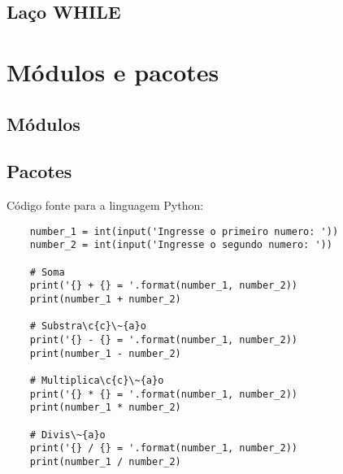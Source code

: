            \subsection{La\c{c}o WHILE}


    \section{M\'{o}dulos e pacotes}



            \subsection{M\'{o}dulos}



            \subsection{Pacotes}






    C\'{o}digo fonte para a linguagem Python:
    \begin{lstlisting}
    number_1 = int(input('Ingresse o primeiro numero: '))
    number_2 = int(input('Ingresse o segundo numero: '))

    # Soma
    print('{} + {} = '.format(number_1, number_2))
    print(number_1 + number_2)

    # Substra\c{c}\~{a}o
    print('{} - {} = '.format(number_1, number_2))
    print(number_1 - number_2)

    # Multiplica\c{c}\~{a}o
    print('{} * {} = '.format(number_1, number_2))
    print(number_1 * number_2)

    # Divis\~{a}o
    print('{} / {} = '.format(number_1, number_2))
    print(number_1 / number_2)
    \end{lstlisting}






